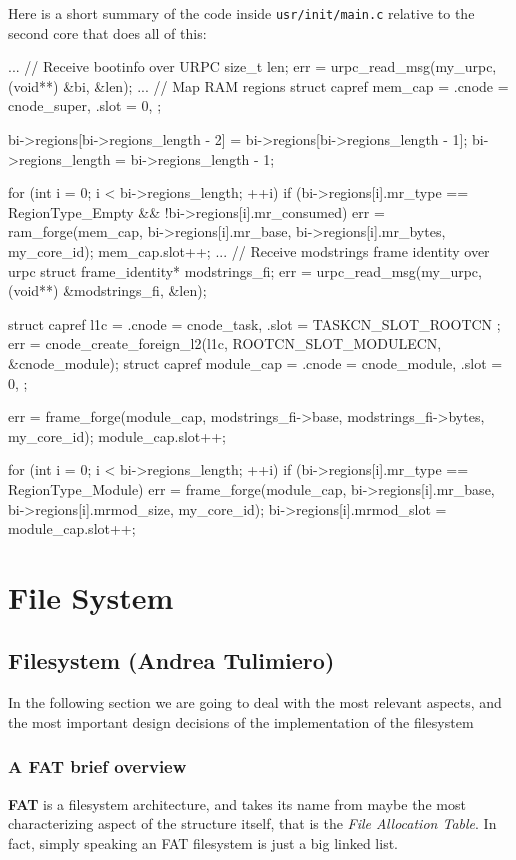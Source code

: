 \documentclass[a4paper,twoside,openright]{report}
\renewcommand{\t}[1]{%
	{\texttt{#1}}}
\begin{document}
Here is a short summary of the code inside \t{usr/init/main.c} relative to the second core
that does all of this:
\begin{pandacode}
...
// Receive bootinfo over URPC
size_t len;
err = urpc_read_msg(my_urpc, (void**) &bi, &len);
...
// Map RAM regions
struct capref mem_cap = {
	.cnode = cnode_super,
	.slot = 0,
};

bi->regions[bi->regions_length - 2] = bi->regions[bi->regions_length - 1];
bi->regions_length = bi->regions_length - 1;

for (int i = 0; i < bi->regions_length; ++i) {
	if (bi->regions[i].mr_type == RegionType_Empty &&
		!bi->regions[i].mr_consumed) {
		err = ram_forge(mem_cap, bi->regions[i].mr_base, 
		bi->regions[i].mr_bytes, my_core_id);
		mem_cap.slot++;
	}
}
...
// Receive modstrings frame identity over urpc
struct frame_identity* modstrings_fi;
err = urpc_read_msg(my_urpc, (void**) &modstrings_fi, &len);

struct capref l1c = {
	.cnode = cnode_task,
	.slot = TASKCN_SLOT_ROOTCN
};
err = cnode_create_foreign_l2(l1c, ROOTCN_SLOT_MODULECN, &cnode_module);
struct capref module_cap = {
	.cnode = cnode_module,
	.slot = 0,
};

err = frame_forge(module_cap, modstrings_fi->base, 
	modstrings_fi->bytes, my_core_id);
module_cap.slot++;

for (int i = 0; i < bi->regions_length; ++i) {
	if (bi->regions[i].mr_type == RegionType_Module) {
		err = frame_forge(module_cap, bi->regions[i].mr_base, 
		bi->regions[i].mrmod_size, my_core_id);
		bi->regions[i].mrmod_slot = module_cap.slot++;
	}
}
\end{pandacode}


\chapter{File System} \label{cap:fs}
\section{Filesystem (Andrea Tulimiero)}
In the following section we are going to deal with the most relevant aspects, and the most important design decisions of the implementation of the filesystem

\subsection{A FAT brief overview}
\textbf{FAT} is a filesystem architecture, and takes its name from maybe the most characterizing aspect of the structure itself, that is the \emph{File Allocation Table}.
In fact, simply speaking an FAT filesystem is just a big linked list.
\end{document}
